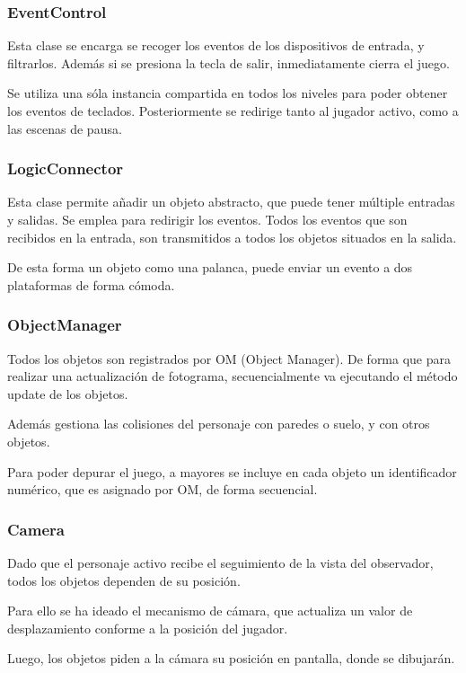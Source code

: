 \documentclass[11pt,a4paper]{article}
\begin{document}
\subsubsection{EventControl}
Esta clase se encarga se recoger los eventos de los dispositivos de entrada, y 
filtrarlos. Además si se presiona la tecla de salir, inmediatamente cierra el 
juego.

Se utiliza una sóla instancia compartida en todos los niveles para poder obtener 
los eventos de teclados. Posteriormente se redirige tanto al jugador activo, 
como a las escenas de pausa.

\subsubsection{LogicConnector}
Esta clase permite añadir un objeto abstracto, que puede tener múltiple entradas 
y salidas. Se emplea para redirigir los eventos. Todos los eventos que son 
recibidos en la entrada, son transmitidos a todos los objetos situados en la 
salida.

De esta forma un objeto como una palanca, puede enviar un evento a dos 
plataformas de forma cómoda.

\subsubsection{ObjectManager}

Todos los objetos son registrados por OM (Object Manager). De forma que para 
realizar una actualización de fotograma, secuencialmente va ejecutando el método 
update de los objetos.

Además gestiona las colisiones del personaje con paredes o suelo, y con otros 
objetos.

Para poder depurar el juego, a mayores se incluye en cada objeto un 
identificador numérico, que es asignado por OM, de forma secuencial.

\subsubsection{Camera}
Dado que el personaje activo recibe el seguimiento de la vista del observador, 
todos los objetos dependen de su posición.

Para ello se ha ideado el mecanismo de cámara, que actualiza un valor de 
desplazamiento conforme a la posición del jugador.

Luego, los objetos piden a la cámara su posición en pantalla, donde se 
dibujarán.
\end{document}
